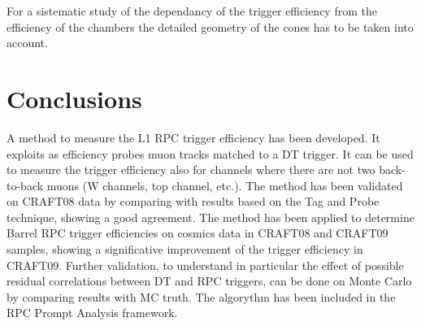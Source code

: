 For a sistematic  study of the  dependancy of the trigger efficiency 
from the efficiency of the chambers the detailed 
geometry of the  cones has to be taken into account.

\section{Conclusions}
A method to measure the L1 RPC trigger efficiency has been developed.
It exploits as efficiency probes muon tracks matched to a DT trigger. 
It can be used to measure the trigger efficiency also for channels where 
there are not two back-to-back muons (W channels, top channel, etc.).
The method has been validated on CRAFT08 data by comparing with results 
based on the Tag and Probe technique, showing a good agreement.
The method has been applied to determine Barrel RPC trigger efficiencies 
on cosmics data in CRAFT08 and CRAFT09 samples, showing a significative 
improvement of the trigger efficiency in CRAFT09.
Further validation, to understand in particular the effect of possible 
residual correlations between DT and RPC triggers, can be done on Monte Carlo 
by comparing results with MC truth.
The algorythm has been included in the RPC Prompt Analysis framework.



